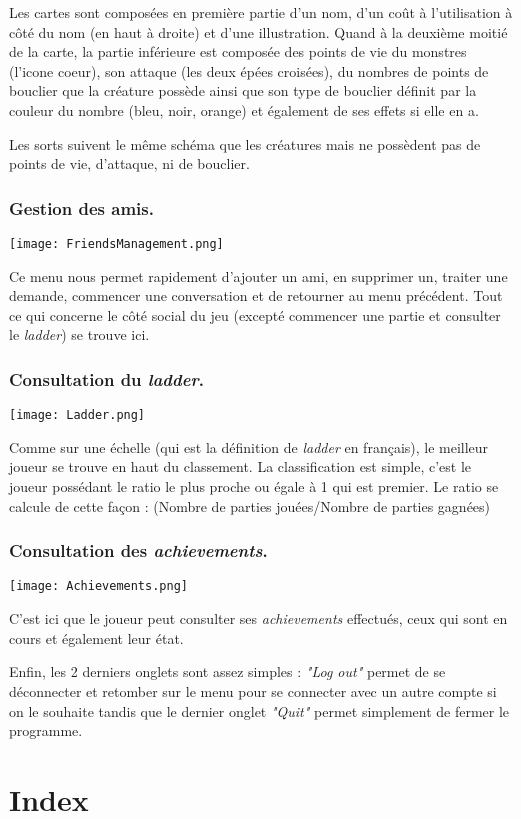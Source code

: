 \documentclass[12pt]{article}
\begin{document}
		Les cartes sont composées en première partie d'un nom, d'un coût à l'utilisation à côté du nom (en haut à droite) et d'une illustration.
		Quand à la deuxième moitié de la carte, la partie inférieure est composée des points de vie du monstres (l'icone coeur), son attaque (les deux épées croisées), du nombres de points de bouclier que la créature possède ainsi que son type de bouclier définit par la couleur du nombre (bleu, noir, orange) et également de ses effets si elle en a.

		Les \glspl{sort} suivent le même schéma que les créatures mais ne possèdent pas de points de vie, d'attaque, ni de bouclier.

		\subsubsection{Gestion des amis.}
		\begin{center}\texttt{[image: FriendsManagement.png]}\end{center}
		Ce menu nous permet rapidement d'ajouter un ami, en supprimer un, traiter une demande, commencer une conversation et de retourner au menu précédent.
		Tout ce qui concerne le côté social du jeu (excepté commencer une partie et consulter le \textit{\gls{ladder}}) se trouve ici.

		\subsubsection{Consultation du \textit{\gls{ladder}}.}
		\begin{center}\texttt{[image: Ladder.png]}\end{center}
		Comme sur une échelle (qui est la définition de \textit{\gls{ladder}} en français), le meilleur joueur se trouve en haut du classement.
		La classification est simple, c'est le joueur possédant le ratio le plus proche ou égale à 1 qui est premier.
		Le ratio se calcule de cette façon : (Nombre de parties jouées/Nombre de parties gagnées)

		\subsubsection{Consultation des \textit{\gls{achievements}}.}
		\begin{center}\texttt{[image: Achievements.png]}\end{center}	
		C'est ici que le joueur peut consulter ses \textit{\gls{achievements}} effectués, ceux qui sont en cours et également leur état.

		Enfin, les 2 derniers onglets sont assez simples : \textit{"Log out"} permet de se déconnecter et retomber sur le menu pour se connecter avec un autre compte si on le souhaite tandis que le dernier onglet \textit{"Quit"} permet simplement de fermer le programme.



\newpage
\section{Index}
		\printglossary[type=glossary, style=Index, title=]
\end{document}

